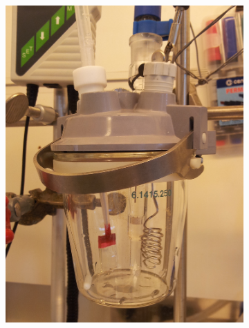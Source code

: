 \documentclass[webedition,openright,titles,swedish,english]{LuaUUThesis}\usepackage[]{graphicx}\usepackage[]{xcolor}
\begin{document}
\begin{figure}[tbp]
\centering
\begin{subfigure}[b]{0.25\linewidth}
   \centering
   \includegraphics[width=\textwidth]{synthesis/electrodeposition/0310114755-cropped.jpg}
   \caption{}
   \label{fig:0301-ED-Autolab02-a}
\end{subfigure}%
\hspace{7pt}%
\begin{subfigure}[b]{0.25\linewidth}
   \centering

\end{subfigure}
\end{figure}
\end{document}
